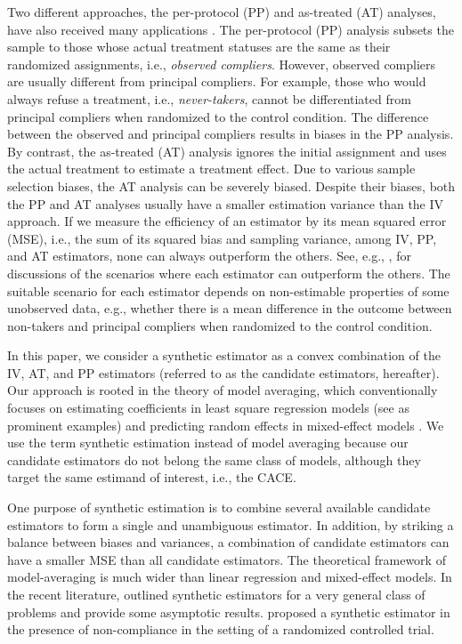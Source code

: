 \documentclass{article}
\begin{document}
Two different approaches, the per-protocol (PP) and as-treated (AT) analyses, have also received many applications \citep{higgins2008cochrane, mcnamee2009intention}. The per-protocol (PP) analysis subsets the sample to those whose actual treatment statuses are the same as their randomized assignments, i.e., \textit{observed compliers}.  However,  observed compliers are usually different from principal compliers. For example, those who would always refuse a treatment, i.e., \textit{never-takers}, cannot be differentiated from principal compliers when randomized to the control condition.  The difference between the observed and principal compliers results in biases in the PP analysis. By contrast, the as-treated (AT) analysis ignores the initial assignment and uses the actual treatment to estimate a treatment effect.  Due to various sample selection biases, the AT analysis can be severely biased.  Despite their biases, both the PP and AT analyses usually have a smaller estimation variance than the IV approach.  If we measure the efficiency of an estimator by its mean squared error (MSE), i.e., the sum of its squared bias and sampling variance, among IV, PP, and AT estimators, none can always outperform the others.  See, e.g., \citep{little2009comparison, antonelli2017synthetic}, for discussions of the scenarios where each estimator can outperform the others.  The suitable scenario for each estimator depends on non-estimable properties of some unobserved data, e.g., whether there is a mean difference in the outcome between non-takers and principal compliers when randomized to the control condition.  

In this paper, we consider a synthetic estimator as a convex combination of the IV, AT, and PP estimators (referred to as the candidate estimators, hereafter).  
Our approach is rooted in the theory of model averaging, which conventionally focuses on estimating coefficients in least square regression models (see \citep{buckland1997model, hjort2003frequentist, judge2004semiparametric, mittelhammer2005combining, longford2006missing, hansen2007least} as prominent examples) and predicting random effects in mixed-effect models \citep{robinson1991blup, ghosh1994small, Searle1997, longford2006missing}. We use the term synthetic estimation instead of model averaging because our candidate estimators do not belong the same class of models, although they target the same estimand of interest, i.e., the CACE.

One purpose of synthetic estimation is to combine several available candidate estimators to form a single and unambiguous estimator.  In addition, by striking a balance between biases and variances, a combination of candidate estimators can have a smaller MSE than all candidate estimators. The theoretical framework of model-averaging is much wider than linear regression and mixed-effect models.  In the recent literature, \citep{lavancier2016general} outlined synthetic estimators for a very general class of problems and provide some asymptotic results. \citet{antonelli2017synthetic} proposed a synthetic estimator in the presence of non-compliance in the setting of a randomized controlled trial.  
\end{document}
